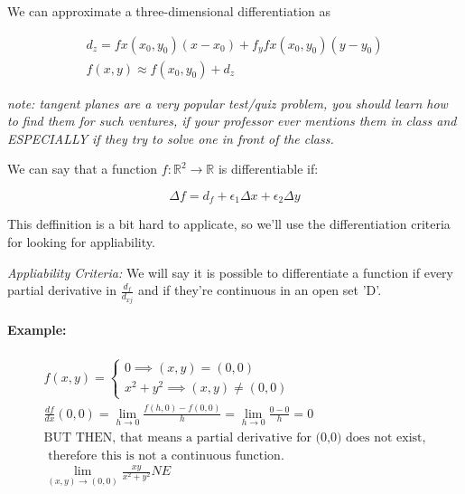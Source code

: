 \documentclass[11pt,fleqn]{book} %
\begin{document}
We can approximate a three-dimensional differentiation as 

\begin{gather}
    d_z = fx(x_0, y_0)(x - x_0) + f_yfx(x_0, y_0)(y - y_0)\\
    f(x,y) \approx f(x_0, y_0) + d_z
\end{gather}

\textit{note: tangent planes are a very popular test/quiz problem, you should
learn how to find them for such ventures, if your professor ever mentions them
in class and ESPECIALLY if they try to solve one in front of the class.}

We can say that a function $ f: \mathbb{R}^2 \to \mathbb{R} $ is differentiable if:

\begin{equation}
    \Delta f = d_f + \epsilon_1 \Delta x +\epsilon_2 \Delta y 
\end{equation}

\noindent This deffinition is a bit hard to applicate, so we'll use the differentiation criteria for 
looking for appliability.

\textit{Appliability Criteria: }
We will say it is possible to differentiate a function if every partial derivative in $\frac{d_f}{d_{xj}}$
and if they're continuous in an open set 'D'.

\paragraph*{Example:}
\begin{gather}
    f(x,y) = \begin{cases}
        0 \implies (x, y) = (0,0) \\
        x^2 + y^2 \implies (x,y) \neq (0,0)
    \end{cases} \\
    \frac{df}{dx} (0,0)= \lim_{h \to 0}  \frac{f(h, 0) - f(0,0)}{h} = \lim_{h \to 0}  \frac{0 - 0}{h} = 0 \\
    \text{BUT THEN, that means a partial derivative for (0,0) does not exist,}\\ \text{ therefore this is not a continuous function.} \\
    \lim_{(x,y) \to (0,0)}  \frac{xy}{x^2+y^2} NE
\end{gather}
\end{document}
